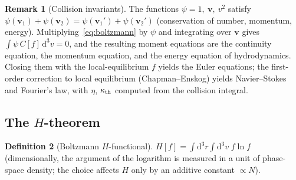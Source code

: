 \documentclass[11pt,a4paper]{report}
\theoremstyle{definition}
\newtheorem{definition}{Definition}[chapter]
\newtheorem{remark}[definition]{Remark}
\theoremstyle{plain}
\newcommand{\dd}{\mathrm{d}}
\newcommand{\vv}{\mathbf{v}}
\begin{document}
\begin{remark}[Collision invariants]
The functions $\psi=1,\ \vv,\ v^2$ satisfy $\psi(\vv_1)+\psi(\vv_2)=\psi(\vv_1')+\psi(\vv_2')$ (conservation of number, momentum, energy). Multiplying~\eqref{eq:boltzmann} by $\psi$ and integrating over $\vv$ gives $\int\psi\,C[f]\,\dd^3v=0$, and the resulting moment equations are the continuity equation, the momentum equation, and the energy equation of hydrodynamics. Closing them with the local-equilibrium $f$ yields the Euler equations; the first-order correction to local equilibrium (Chapman--Enskog) yields Navier--Stokes and Fourier's law, with $\eta$, $\kappa_{\rm th}$ computed from the collision integral.
\end{remark}

\subsection{The $H$-theorem}

\begin{definition}[Boltzmann $H$-functional]
$H[f]=\int\dd^3r\int\dd^3v\;f\ln f$ (dimensionally, the argument of the logarithm is measured in a unit of phase-space density; the choice affects $H$ only by an additive constant $\propto N$).
\end{definition}
\end{document}
